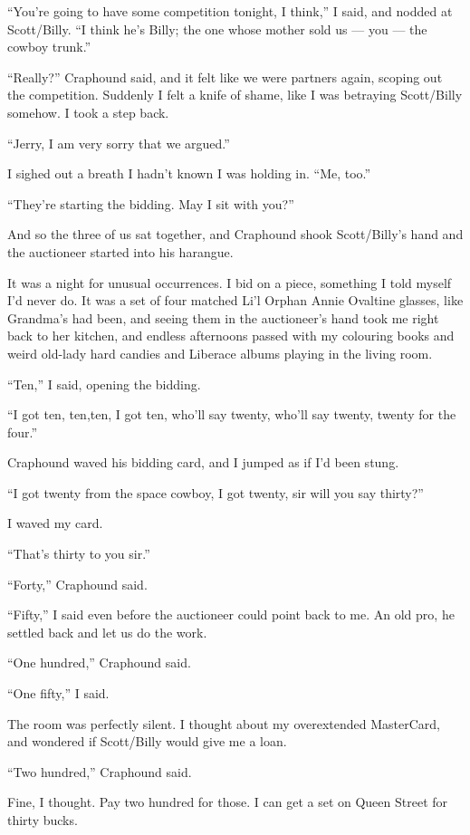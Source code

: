 ``You're going to have some competition tonight, I think,'' I said,
and nodded at Scott/Billy.
``I think he's Billy; the one whose mother sold us --- you --- the 
cowboy trunk.''

``Really?'' Craphound said, and it felt like we were partners
again, scoping out the competition. Suddenly I felt a knife of
shame, like I was betraying Scott/Billy somehow. I took a step
back.

``Jerry, I am very sorry that we argued.''

I sighed out a breath I hadn't known I was holding in.
``Me, too.''

``They're starting the bidding. May I sit with you?''

And so the three of us sat together, and Craphound shook
Scott/Billy's hand and the auctioneer started into his harangue.

It was a night for unusual occurrences. I bid on a piece, something
I told myself I'd never do. It was a set of four matched Li'l
Orphan Annie Ovaltine glasses, like Grandma's had been, and seeing
them in the auctioneer's hand took me right back to her kitchen,
and endless afternoons passed with my colouring books and weird
old-lady hard candies and Liberace albums playing in the living
room.

``Ten,'' I said, opening the bidding.

``I got ten, ten,ten, I got ten, who'll say twenty, who'll say twenty, 
twenty for the four.''

Craphound waved his bidding card, and I jumped as if I'd been
stung.

``I got twenty from the space cowboy, I got twenty, sir will you say thirty?''

I waved my card.

``That's thirty to you sir.''

``Forty,'' Craphound said.

``Fifty,'' I said even before the auctioneer could point back to
me. An old pro, he settled back and let us do the work.

``One hundred,'' Craphound said.

``One fifty,'' I said.

The room was perfectly silent. I thought about my overextended
MasterCard, and wondered if Scott/Billy would give me a loan.

``Two hundred,'' Craphound said.

Fine, I thought. Pay two hundred for those. I can get a set on
Queen Street for thirty bucks.

